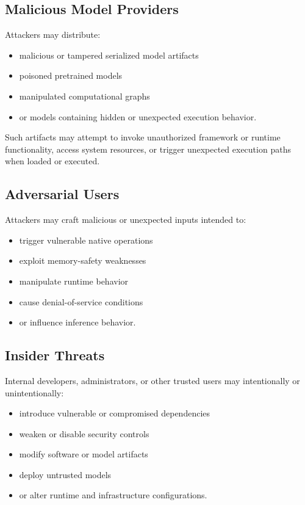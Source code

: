 \documentclass[
  12pt,
  letterpaper,
  oneside]{report}
\providecommand{\tightlist}{%
  \setlength{\itemsep}{0pt}\setlength{\parskip}{0pt}}
\begin{document}
\subsection{Malicious Model Providers}\label{633-malicious-model-providers}

Attackers may distribute:

\begin{itemize}
\tightlist
\item
  malicious or tampered serialized model artifacts
\item
  poisoned pretrained models
\item
  manipulated computational graphs
\item
  or models containing hidden or unexpected execution behavior.
\end{itemize}

Such artifacts may attempt to invoke unauthorized framework or runtime
functionality, access system resources, or trigger unexpected execution
paths when loaded or executed.

\subsection{Adversarial Users}\label{634-adversarial-users}

Attackers may craft malicious or unexpected inputs intended to:

\begin{itemize}
\tightlist
\item
  trigger vulnerable native operations
\item
  exploit memory-safety weaknesses
\item
  manipulate runtime behavior
\item
  cause denial-of-service conditions
\item
  or influence inference behavior.
\end{itemize}

\subsection{Insider Threats}\label{635-insider-threats}

Internal developers, administrators, or other trusted users may
intentionally or unintentionally:

\begin{itemize}
\tightlist
\item
  introduce vulnerable or compromised dependencies
\item
  weaken or disable security controls
\item
  modify software or model artifacts
\item
  deploy untrusted models
\item
  or alter runtime and infrastructure configurations.
\end{itemize}
\end{document}
